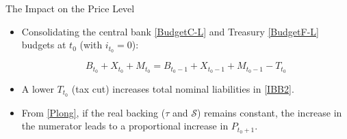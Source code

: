 \documentclass[11pt,aspectratio=169]{beamer}
\begin{document}
\begin{frame}{The Impact on the Price Level}
\small
\begin{itemize}
    \item Consolidating the  central bank  \eqref{BudgetC-L} and Treasury \eqref{BudgetF-L} budgets at $t_0$ (with $i_{t_0}=0$):
        \vspace{0.3cm}

    \begin{equation}
        B_{t_0}+X_{t_0}+M_{t_0} = B_{t_0-1}+X_{t_0-1}+M_{t_0-1} - T_{t_0} \label{IBB2}
    \end{equation}
    \vspace{0.3cm}
        \item A lower $T_{t_0}$ (tax cut) increases total nominal liabilities in \eqref{IBB2}.

    \vspace{0.3cm}

        \item From \eqref{Plong}, if the real backing ($\tau$ and $\mathcal{S}$) remains constant, the increase in the numerator leads to a proportional increase in $P_{t_0+1}$.
\end{itemize}
\end{frame}
\end{document}
